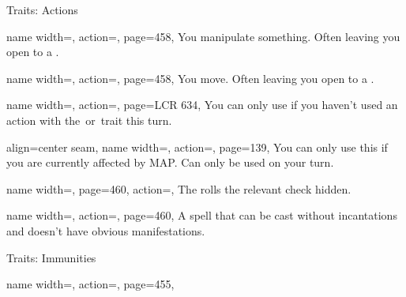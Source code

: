 \begin{PageFrontLandscape}
\begin{TablesHalf}{\frontTableHeight}
\begin{Table}{Traits: Actions}
\begin{entry}{}{%
                name width=\conditionLength,%
                action=\Manipulate,
                page=458,
            }
                You manipulate something.
                Often leaving you open to a .
            \end{entry}
            \begin{entry}{}{%
                name width=\conditionLength,%
                action=\Move,
                page=458,
            }
                You move.
                Often leaving you open to a .
            \end{entry}
            \begin{entry}{}{%
                name width=\conditionLength,%
                action=\Open,
                page=LCR 634,
            }
                You can only use if you haven't used an action with the \Attack\,or \Open\,trait this turn.
            \end{entry}
            \begin{entry}{}{%
                align=center seam,
                name width=\conditionLength,%
                action=\Press,
                page=139,
            }
                You can only use this if you are currently affected by MAP. Can only be used on your turn.\\
            \end{entry}
            \begin{entry}{}{%
                name width=\conditionLength,%
                page=460,
                action=\Secret {},
            }
                The \GM rolls the relevant check hidden.
            \end{entry}
            \begin{entry}{}{%
                name width=\conditionLength,%
                action=\Subtle,
                page=460,
            }
                A spell that can be cast without incantations and doesn't have obvious manifestations. \hfill
            \end{entry}
        \end{Table}
        \TableSpace
        \begin{Table}{Traits: Immunities}
            \begin{entry}{}{%
                name width=\conditionLength,%
                action=\Emotion,
                page=455,
            }

\end{entry}
\end{Table}
\end{TablesHalf}
\end{PageFrontLandscape}
